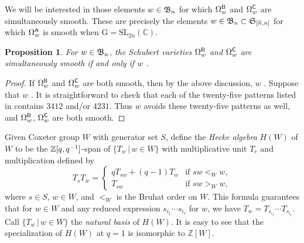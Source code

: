 \documentclass[11pt]{article}
\newtheorem{prop}[theo]{Proposition}
\theoremstyle{definition}
\numberwithin{equation}{section}
\begin{document}
We will be interested in those elements $w \in \mathfrak{B}_n$ for which
$\Omega_{w}^{\mathsf{B}}$
and
$\Omega_{w}^{\mathsf{C}}$
are simultaneously smooth.
These are precisely the elements $w \in \mathfrak{B}_n \subset \mathfrak{S}_{\smash{[\overline{n}, n]}}$ for which
$\Omega_{w}^{\mathsf{A}}$ is smooth when $\mathrm G = \mathrm{SL}_{2n}(\mathbb C)$.
\begin{prop}\label{p:bcavoid}
  For $w \in \mathfrak{B}_n$,
  the
  Schubert varieties
  $\Omega_{w}^{\mathsf{B}}$
  and
  $\Omega_{w}^{\mathsf{C}}$
  are simultaneously smooth
  if and only if
  $w$ \avoidsp.
\end{prop}
\begin{proof}
  If $\Omega_{w}^{\mathsf{B}}$
  and
  $\Omega_{w}^{\mathsf{C}}$
  are both smooth, then
  by the above discussion,
  $w$ \avoidsp.
  Suppose that
  $w$ \avoidsp.
  It is straightforward to check that  
  each of the twenty-five patterns listed in
  \cite[Eq.\,(13.3.5)]{BilleyLak}
  contains $3412$ and/or $4231$.
  Thus
  $w$ avoids these twenty-five patterns as well,
  and
  $\Omega_{w}^{\mathsf{B}}$,
  $\Omega_{w}^{\mathsf{C}}$
  are both smooth.
\end{proof}

\label{ss:hecke}

Given Coxeter group $W$ with generator set $S$, define
the {\em Hecke algebra} $H(W)$ of $W$ to be
the $\mathbb{Z}[q, q^{-1}]$-span of $\{ T_w \,|\, w \in W \}$
with multiplicative unit $T_e$ and multiplication defined by
\begin{equation*}
  T_sT_w =
  \begin{cases}
    qT_{sw} + (q-1)T_w &\text{if $sw <_W w$},\\
    T_{sw} &\text{if $sw >_W w$},
  \end{cases}
\end{equation*}
where $s \in S$, $w \in W$, and $<_W$ is the Bruhat order on $W$.
This formula guarantees that for $w \in W$ and
any reduced expression $s_{i_1} \cdots s_{i_\ell}$ for $w$,
we have $T_w = T_{s_{i_1}} \cdots T_{s_{i_\ell}}$.
Call $\{ T_w \,|\, w \in W \}$ the {\em natural basis} of $H(W)$.
It is easy to see that the specialization of $H(W)$ at $q=1$
is isomorphic to $\mathbb Z[W]$.
\end{document}
